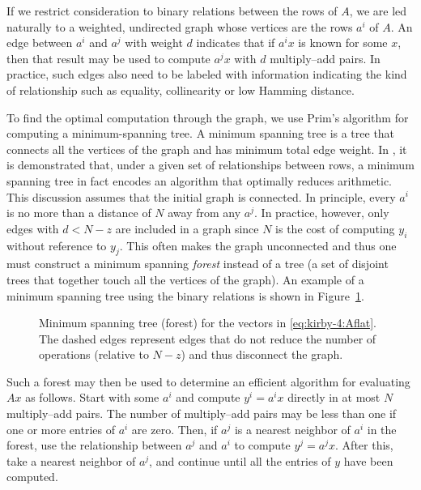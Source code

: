 If we restrict consideration to binary relations between the rows of $
A $, we are led naturally to a weighted, undirected graph whose
vertices are the rows $ a^i $ of $A$.  An edge between $ a^i $ and $
a^j $ with weight $ d $ indicates that if $ a^i x $ is known for some
$ x $, then that result may be used to compute $ a^j x $ with $ d $
multiply--add pairs.  In practice, such edges also need to be labeled
with information indicating the kind of relationship such as equality,
collinearity or low Hamming distance.

To find the optimal computation through the graph, we use Prim's
algorithm \citep{Prim1957} for computing a minimum-spanning tree. A
minimum spanning tree is a tree that connects all the vertices of the
graph and has minimum total edge
weight. In \citet{KirbyLoggScottEtAl2006}, it is demonstrated that,
under a given set of relationships between rows, a minimum spanning
tree in fact encodes an algorithm that optimally reduces arithmetic.
This discussion assumes that the initial graph is connected. In
principle, every $ a^i $ is no more than a distance of $ N $ away from
any $ a^j $. In practice, however, only edges with $d < N - z$ are
included in a graph since $N$ is the cost of computing $ y_i $ without
reference to $ y_j $. This often makes the graph unconnected and thus
one must construct a minimum spanning \emph{forest} instead of a tree
(a set of disjoint trees that together touch all the vertices of the
graph). An example of a minimum spanning tree using the binary
relations is shown in Figure~\ref{fig:kirby-4:mst}.

\begin{figure}
  \begin{center}
  \def\svgwidth{\columnwidth} %
   
    \caption{Minimum spanning tree (forest) for the vectors in
      \eqref{eq:kirby-4:Aflat}. The dashed edges represent edges that
      do not reduce the number of operations (relative to $N - z$) and
      thus disconnect the graph.}
    \label{fig:kirby-4:mst}
  \end{center}
\end{figure}

Such a forest may then be used to determine an efficient algorithm for
evaluating $ A x $ as follows. Start with some $ a^i $ and
compute $ y^i = a^i x $ directly in at most $ N $ multiply--add
pairs. The number of multiply--add pairs may be less than one if one
or more entries of $a^i$ are zero. Then, if $ a^j $ is a nearest
neighbor of $ a^i $ in the forest, use the relationship between $
a^j $ and $ a^i $ to compute $ y^j = a^j x $.  After this, take a
nearest neighbor of $ a^j $, and continue until all the entries of
$ y $ have been computed.


